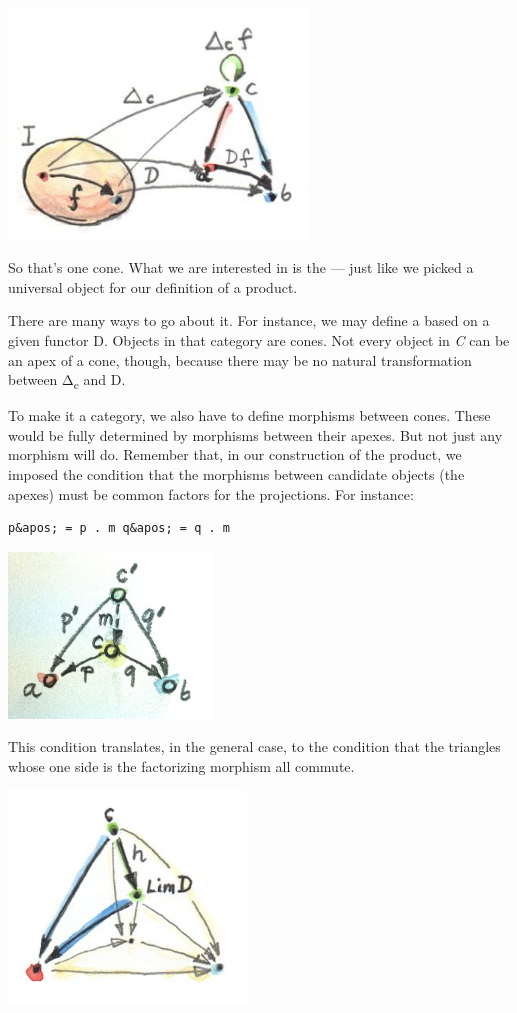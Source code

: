 \includegraphics[width=3.12500in]{images/conenaturality.jpg}

So that's one cone. What we are interested in is the  --- just like we picked a universal object for our definition of a
product.

There are many ways to go about it. For instance, we may define a
 based on a given functor D. Objects in that
category are cones. Not every object  in \emph{C} can be an
apex of a cone, though, because there may be no natural transformation
between Δ\textsubscript{c} and D.

To make it a category, we also have to define morphisms between cones.
These would be fully determined by morphisms between their apexes. But
not just any morphism will do. Remember that, in our construction of the
product, we imposed the condition that the morphisms between candidate
objects (the apexes) must be common factors for the projections. For
instance:

\begin{verbatim}
p&apos; = p . m q&apos; = q . m
\end{verbatim}

\includegraphics[width=2.13542in]{images/productranking.jpg}

This condition translates, in the general case, to the condition that
the triangles whose one side is the factorizing morphism all commute.

\hypertarget{attachment_4487}{}
\includegraphics[width=2.48958in]{images/conecommutativity.jpg}

